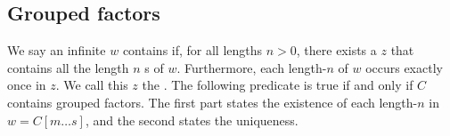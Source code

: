 






\subsection{Grouped factors}

We say an infinite \word $w$ contains  if, for all lengths $n > 0$, there exists a \factor $z$ that contains all the  length $n$ \factor{}s of $w$.
Furthermore, each length-$n$ \factor of $w$ occurs exactly once in $z$.
We call this \factor $z$ the .
The following predicate is true if and only if $C$ contains grouped factors.
The first part states the existence of each length-$n$ \factor in $w = C[m \ldots s]$, and the second states the uniqueness.

